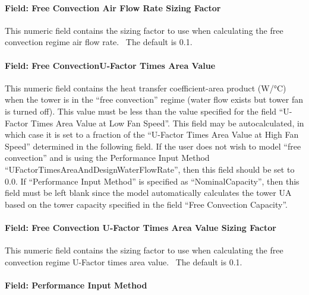 \paragraph{Field: Free Convection Air Flow Rate Sizing Factor}\label{field-free-convection-air-flow-rate-sizing-factor}

This numeric field contains the sizing factor to use when calculating the free convection regime air flow rate.~ The default is 0.1.

\paragraph{Field: Free ConvectionU-Factor Times Area Value}\label{field-free-convectionu-factor-times-area-value}

This numeric field contains the heat transfer coefficient-area product (W/°C) when the tower is in the ``free convection'' regime (water flow exists but tower fan is turned off). This value must be less than the value specified for the field ``U-Factor Times Area Value at Low Fan Speed''. This field may be autocalculated, in which case it is set to a fraction of the ``U-Factor Times Area Value at High Fan Speed'' determined in the following field. If the user does not wish to model ``free convection'' and is using the Performance Input Method ``UFactorTimesAreaAndDesignWaterFlowRate'', then this field should be set to 0.0. If ``Performance Input Method'' is specified as ``NominalCapacity'', then this field must be left blank since the model automatically calculates the tower UA based on the tower capacity specified in the field ``Free Convection Capacity''.

\paragraph{Field: Free Convection U-Factor Times Area Value Sizing Factor}\label{field-free-convection-u-factor-times-area-value-sizing-factor-1}

This numeric field contains the sizing factor to use when calculating the free convection regime U-Factor times area value.~ The default is 0.1.

\paragraph{Field: Performance Input Method}\label{field-performance-input-method-1}

